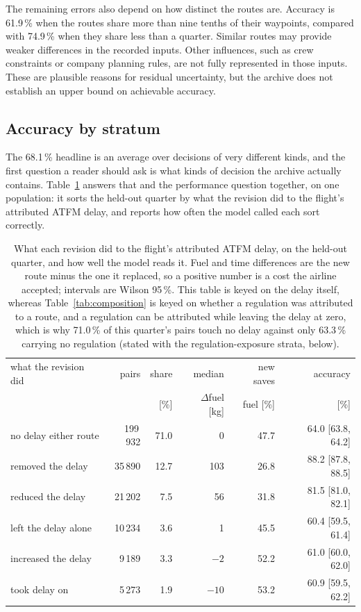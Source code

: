 \documentclass[preprint,authoryear,12pt]{elsarticle}
\begin{document}
The remaining errors also depend on how distinct the routes are.
Accuracy is 61.9\,\% when the routes share more than nine tenths of
their waypoints, compared with 74.9\,\% when they share less than a
quarter. Similar routes may provide weaker differences in the recorded
inputs. Other influences, such as crew constraints or company planning
rules, are not fully represented in those inputs. These are plausible
reasons for residual uncertainty, but the archive does not establish an
upper bound on achievable accuracy.

\subsection{Accuracy by stratum}
\label{sec:strata}

The 68.1\,\% headline is an average over decisions of very different
kinds, and the first question a reader should ask is what kinds of
decision the archive actually contains. Table~\ref{tab:context} answers
that and the performance question together, on one population: it sorts
the held-out quarter by what the revision did to the flight's
attributed ATFM delay, and reports how often the model called each sort
correctly.

\begin{table}[t]
\caption{What each revision did to the flight's attributed ATFM delay,
on the held-out quarter, and how well the model reads it. Fuel and
time differences are the new route minus the one it replaced, so a
positive number is a cost the airline accepted; intervals are Wilson
95\,\%. This table is keyed on the delay itself, whereas
Table~\ref{tab:composition} is keyed on whether a regulation was
attributed to a route, and a regulation can be attributed while
leaving the delay at zero, which is why 71.0\,\% of this quarter's
pairs touch no delay against only 63.3\,\% carrying no regulation
(stated with the regulation-exposure strata, below).}
\label{tab:context}
\centering\small
\setlength{\tabcolsep}{4pt}%
\begin{tabular}{lrrrrr}
\toprule
what the revision did & pairs & share & median & new saves & accuracy \\
                      &       & [\%]  & $\Delta$fuel [kg] & fuel [\%] & [\%] \\
\midrule
no delay either route  & 199\,932 & 71.0 & 0     & 47.7 & 64.0 [63.8, 64.2] \\
removed the delay      & 35\,890  & 12.7 & 103   & 26.8 & 88.2 [87.8, 88.5] \\
reduced the delay      & 21\,202  & 7.5  & 56    & 31.8 & 81.5 [81.0, 82.1] \\
left the delay alone   & 10\,234  & 3.6  & 1     & 45.5 & 60.4 [59.5, 61.4] \\
increased the delay    & 9\,189   & 3.3  & $-2$  & 52.2 & 61.0 [60.0, 62.0] \\
took delay on          & 5\,273   & 1.9  & $-10$ & 53.2 & 60.9 [59.5, 62.2] \\
\bottomrule
\end{tabular}
\end{table}
\end{document}
